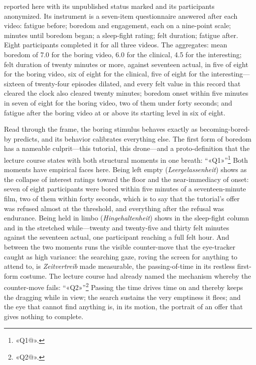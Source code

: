 reported here with its unpublished status marked and its participants anonymized. Its instrument is a seven-item questionnaire answered after each video: fatigue before; boredom and engagement, each on a nine-point scale; minutes until boredom began; a sleep-fight rating; felt duration; fatigue after. Eight participants completed it for all three videos. The aggregates: mean boredom of 7.0 for the boring video, 6.0 for the clinical, 4.5 for the interesting; felt duration of twenty minutes or more, against seventeen actual, in five of eight for the boring video, six of eight for the clinical, five of eight for the interesting---sixteen of twenty-four episodes dilated, and every felt value in this record that cleared the clock also cleared twenty minutes; boredom onset within five minutes in seven of eight for the boring video, two of them under forty seconds; and fatigue after the boring video at or above its starting level in six of eight.

Read through the frame, the boring stimulus behaves exactly as becoming-bored-by predicts, and its behavior calibrates everything else. The first form of boredom has a nameable culprit---this tutorial, this drone---and a proto-definition that the lecture course states with both structural moments in one breath: ``«Q1»''\footnote{«Q1@».} Both moments have empirical faces here. Being left empty (\textit{Leergelassenheit}) shows as the collapse of interest ratings toward the floor and the near-immediacy of onset: seven of eight participants were bored within five minutes of a seventeen-minute film, two of them within forty seconds, which is to say that the tutorial's offer was refused almost at the threshold, and everything after the refusal was endurance. Being held in limbo (\textit{Hingehaltenheit}) shows in the sleep-fight column and in the stretched while---twenty and twenty-five and thirty felt minutes against the seventeen actual, one participant reaching a full felt hour. And between the two moments runs the visible counter-move that the eye-tracker caught as high variance: the searching gaze, roving the screen for anything to attend to, is \textit{Zeitvertreib} made measurable, the passing-of-time in its restless first-form costume. The lecture course had already named the mechanism whereby the counter-move fails: ``«Q2»''\footnote{«Q2@».} Passing the time drives time on and thereby keeps the dragging while in view; the search sustains the very emptiness it flees; and the eye that cannot find anything is, in its motion, the portrait of an offer that gives nothing to complete.

